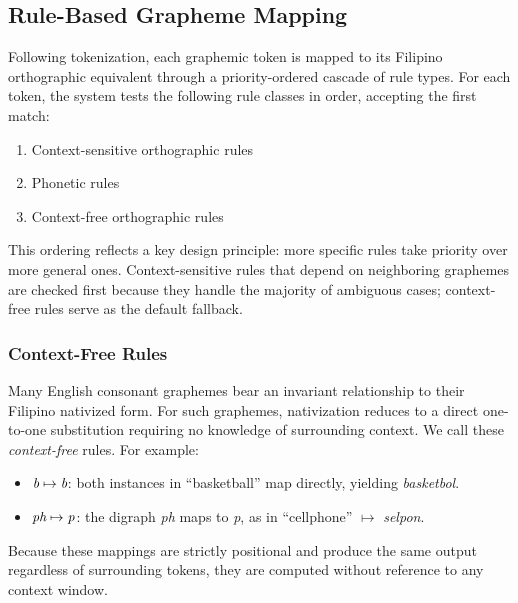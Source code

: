 \subsection{Rule-Based Grapheme Mapping}
Following tokenization, each graphemic token is mapped to its Filipino
orthographic equivalent through a priority-ordered cascade of rule types. For
each token, the system tests the following rule classes in order, accepting the
first match:
\begin{enumerate}
      \item Context-sensitive orthographic rules
      \item Phonetic rules
      \item Context-free orthographic rules
\end{enumerate}
This ordering reflects a key design principle: more specific rules take
priority over more general ones. Context-sensitive rules that depend on
neighboring graphemes are checked first because they handle the majority of
ambiguous cases; context-free rules serve as the default fallback.

\subsubsection{Context-Free Rules}
Many English consonant graphemes bear an invariant relationship to their
Filipino nativized form. For such graphemes, nativization reduces to a direct
one-to-one substitution requiring no knowledge of surrounding context. We call
these \emph{context-free} rules. For example:
\begin{itemize}
      \item \(\emph{b} \mapsto \emph{b}\): both instances in ``basketball'' map
            directly, yielding \emph{basketbol}.
      \item \(\emph{ph} \mapsto \emph{p}\): the digraph \emph{ph}
            maps to \emph{p},
            as in ``cellphone'' \(\mapsto\) \emph{selpon}.
\end{itemize}
Because these mappings are strictly positional and produce the same output
regardless of surrounding tokens, they are computed without reference to any
context window.

